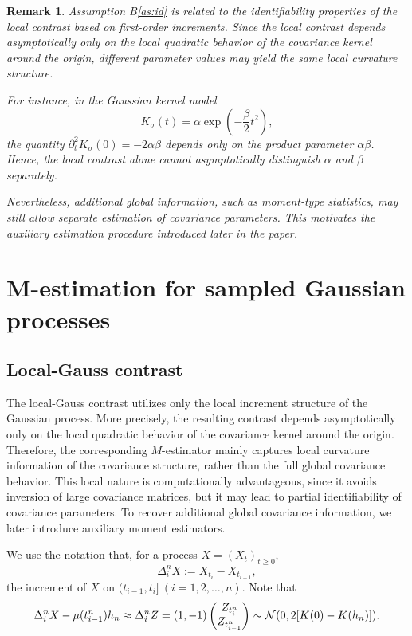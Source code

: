 \documentclass[a4paper,10pt,twoside]{article}
\newtheorem{remark}{Remark}[section]
\numberwithin{equation}{section}
\def\D{\Delta}
\def\l{\left}
\def\r{\right}
\def\a{\alpha}
\def\b{\beta}
\def\s{\sigma}
\def\p{\partial}
\begin{document}
\begin{remark}
Assumption B\ref{as:id} is related to the identifiability properties of the local contrast based on first-order increments.
Since the local contrast depends asymptotically only on the local quadratic behavior of the covariance kernel around the origin, different parameter values may yield the same local curvature structure.

For instance, in the Gaussian kernel model
\[
K_\s(t)=\a\exp\l(-\frac{\b}{2}t^2\r),
\]
the quantity $\p_t^2K_\s(0)=-2\a\b$ depends only on the product parameter $\a\b$.
Hence, the local contrast alone cannot asymptotically distinguish $\a$ and $\b$ separately.

Nevertheless, additional global information, such as moment-type statistics, may still allow separate estimation of covariance parameters.
This motivates the auxiliary estimation procedure introduced later in the paper.\end{remark}






\section{M-estimation for sampled Gaussian processes}\label{sec:M-est}

\subsection{Local-Gauss contrast}\label{sec:local-Gauss}

The local-Gauss contrast utilizes only the local increment structure of the Gaussian process.
More precisely, the resulting contrast depends asymptotically only on the local quadratic behavior of the covariance kernel around the origin.
Therefore, the corresponding $M$-estimator mainly captures local curvature information of the covariance structure,
rather than the full global covariance behavior.  
This local nature is computationally advantageous, since it avoids inversion of large covariance matrices,
but it may lead to partial identifiability of covariance parameters.
To recover additional global covariance information, we later introduce auxiliary moment estimators.


We use the notation that, for a process $X = (X_t)_{t\ge 0}$, 
\[
\D_i^n X := X_{t_i} - X_{t_{i-1}}, 
\]
the increment of $X$ on $(t_{i-1},t_i]\ (i=1,2,\dots,n)$. Note that
\[
\D_i^nX - \mu(t_{i-1}^n) h_n \approx  \D_i^n Z = (1 , -1)\begin{pmatrix}Z_{t_i^n} \\ Z_{t_{i-1}^n} \end{pmatrix} \sim {\cal N}(0, 2[K(0) - K(h_n)]). 
\]
\end{document}
